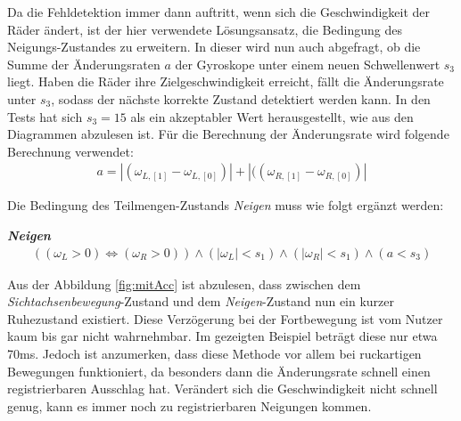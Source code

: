 Da die Fehldetektion immer dann auftritt, wenn sich die Geschwindigkeit der Räder ändert, ist der hier verwendete Lösungsansatz, die Bedingung des Neigungs-Zustandes zu erweitern.
In dieser wird nun auch abgefragt, ob die Summe der Änderungsraten $a$ der Gyroskope unter einem neuen Schwellenwert $s_3$ liegt.
Haben die Räder ihre Zielgeschwindigkeit erreicht, fällt die Änderungsrate unter $s_3$, sodass der nächste korrekte Zustand detektiert werden kann.
In den Tests hat sich $s_3 = 15$ als ein akzeptabler Wert herausgestellt, wie aus den Diagrammen abzulesen ist.
Für die Berechnung der Änderungsrate wird folgende Berechnung verwendet:
\begin{align}
    a = |(\omega_{L,[1]} - \omega_{L,[0]})| + |((\omega_{R,[1]} - \omega_{R,[0]})|
\end{align}

Die Bedingung des Teilmengen-Zustands \textit{Neigen} muss wie folgt ergänzt werden:

\textbf{\textit{Neigen}}
\begin{align}
    ((\omega_L > 0) \Leftrightarrow (\omega_R > 0)) \land (|\omega_L| < s_1) \land (|\omega_R| < s_1) \land (a < s_3)
\end{align}



Aus der Abbildung \ref{fig:mitAcc} ist abzulesen, dass zwischen dem \textit{Sichtachsenbewegung}-Zustand und dem \textit{Neigen}-Zustand nun ein kurzer Ruhezustand existiert.
Diese Verzögerung bei der Fortbewegung ist vom Nutzer kaum bis gar nicht wahrnehmbar.
Im gezeigten Beispiel beträgt diese nur etwa 70ms.
Jedoch ist anzumerken, dass diese Methode vor allem bei ruckartigen Bewegungen funktioniert, da besonders dann die Änderungsrate schnell einen registrierbaren Ausschlag hat.
Verändert sich die Geschwindigkeit nicht schnell genug, kann es immer noch zu registrierbaren Neigungen kommen.